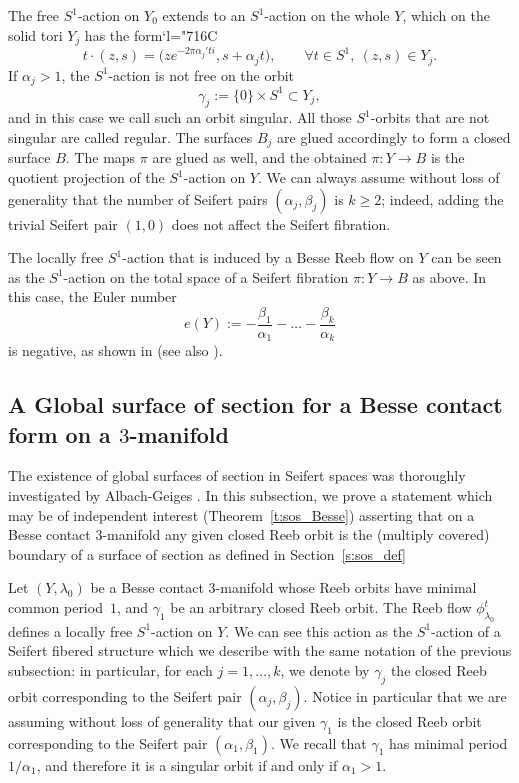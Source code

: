 \documentclass[11pt]{article}
\newcommand{\Subsection}{\subsection}
\numberwithin{equation}{section}
\newcommand{\Changelback}{\mathcode`l="716C}
\theoremstyle{definition}
\let\eul e
\begin{document}
The free $S^1$-action on $Y_0$ extends to an $S^1$-action on the whole $Y$, which on the solid tori $Y_j$ has the form\Changelback
\[
t\cdot(z,s)=\big(z e^{-2\pi\alpha_j't i},s+\alpha_j t\big),
\qquad
\forall t\in S^1,\ (z,s)\in Y_j.
\]
If $\alpha_j>1$, the $S^1$-action is not free on the orbit
\[
\gamma_j:=\{0\}\times S^1\subset Y_j,
\]
and in this case we call such an orbit singular. All those $S^1$-orbits that are not singular are called regular.
The surfaces $B_j$ are glued accordingly to form a closed surface $B$. The maps $\pi$ are glued as well, and the obtained $\pi:Y\to B$ is the quotient projection of the $S^1$-action on $Y$.
We can always assume without loss of generality that the number of Seifert pairs $(\alpha_j,\beta_j)$ is $k\geq2$; indeed, adding the trivial Seifert pair $(1,0)$ does not affect the Seifert fibration.

The locally free $S^1$-action that is induced by a Besse Reeb flow on $Y$ can be seen as the $S^1$-action on the total space of a Seifert fibration $\pi:Y\to B$ as above. In this case, the Euler number
\[
\eul(Y):=-\frac{\beta_1}{\alpha_1}-\dots-\frac{\beta_k}{\alpha_k}
\]
is negative, as shown in \cite{Lisca:2004oz} (see also \cite[Th.\,1.4]{Kegel:2021vo}).

\Subsection{A Global surface of section for a Besse contact form on a $3$-manifold}
\label{s:sos_Besse}
The existence of global surfaces of section in Seifert spaces was thoroughly investigated by Albach-Geiges \cite{Albach:2021wi}. In this subsection, we prove a statement which may be of independent interest (Theorem~\ref{t:sos_Besse}) asserting that on a Besse contact $3$-manifold any given closed Reeb orbit is the (multiply covered) boundary of a surface of section as defined in Section~\ref{s:sos_def}

Let $(Y,\lambda_0)$ be a Besse contact $3$-manifold whose Reeb orbits have minimal common period~$1$, and $\gamma_1$ be an arbitrary closed Reeb orbit. The Reeb flow $\phi_{\lambda_0}^t$ defines a locally free $S^1$-action on $Y$. We can see this action as the $S^1$-action of a Seifert fibered structure which we describe with the same notation of the previous subsection: in particular, for each $j=1,\dots,k$, we denote by $\gamma_j$ the closed Reeb orbit corresponding to the Seifert pair $(\alpha_j,\beta_j)$. Notice in particular that we are assuming without loss of generality that our given $\gamma_1$ is the closed Reeb orbit corresponding to the Seifert pair $(\alpha_1,\beta_1)$. We recall that $\gamma_1$ has minimal period $1/\alpha_1$, and therefore it is a singular orbit if and only if $\alpha_1>1$.
\end{document}
